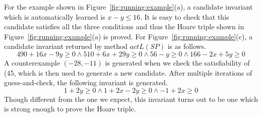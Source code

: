 \begin{example}
For the example shown in Figure~\ref{fig:running:example}(a), a candidate invariant which is automatically learned is $x - y \leq 16$. It is easy to check that this candidate satisfies all the three conditions and thus the Hoare triple shown in Figure~\ref{fig:running:example}(a) is proved. For Figure~\ref{fig:running:example}(c), a candidate invariant returned by method $actL(SP)$ is as follows.
\[
490 + 16x - 9y \geq 0 \land  510 + 6x + 29y \geq 0 \land 56 - y \geq 0 \land 166 - 2x + 5y \geq 0
\]
A counterexample $(-28, -11)$ is generated when we check the satisfiability of (45, which is then used to generate a new candidate. After multiple iterations of guess-and-check, the following invariant is generated.
\[
1 + 2y \geq 0 \land 1 + 2x - 2y \geq 0 \land -1 + 2x \geq 0
\]
Though different from the one we expect, this invariant turns out to be one which is strong enough to prove the Hoare triple.
\end{example}


